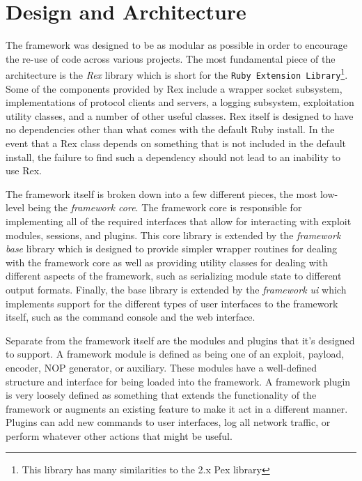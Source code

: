 \documentclass{report}
\begin{document}
    \section{Design and Architecture}

\par
The framework was designed to be as modular as possible in order to
encourage the re-use of code across various projects.  The most
fundamental piece of the architecture is the \textit{Rex} library
which is short for the \texttt{Ruby Extension Library}\footnote{This
library has many similarities to the 2.x Pex library}. Some of the
components provided by Rex include a wrapper socket subsystem,
implementations of protocol clients and servers, a logging
subsystem, exploitation utility classes, and a number of other
useful classes.  Rex itself is designed to have no dependencies
other than what comes with the default Ruby install. In the event
that a Rex class depends on something that is not included in the
default install, the failure to find such a dependency should not
lead to an inability to use Rex.

\par
The framework itself is broken down into a few different pieces, the
most low-level being the \textit{framework core}.  The framework
core is responsible for implementing all of the required interfaces
that allow for interacting with exploit modules, sessions, and
plugins. This core library is extended by the \textit{framework
base} library which is designed to provide simpler wrapper routines
for dealing with the framework core as well as providing utility
classes for dealing with different aspects of the framework, such as
serializing module state to different output formats.  Finally, the
base library is extended by the \textit{framework ui} which
implements support for the different types of user interfaces to the
framework itself, such as the command console and the web interface.

\par
Separate from the framework itself are the modules and plugins that
it's designed to support.  A framework module is defined as being
one of an exploit, payload, encoder, NOP generator, or auxiliary.
These modules have a well-defined structure and interface for being
loaded into the framework.  A framework plugin is very loosely
defined as something that extends the functionality of the framework
or augments an existing feature to make it act in a different
manner. Plugins can add new commands to user interfaces, log all
network traffic, or perform whatever other actions that might be useful.
\end{document}
